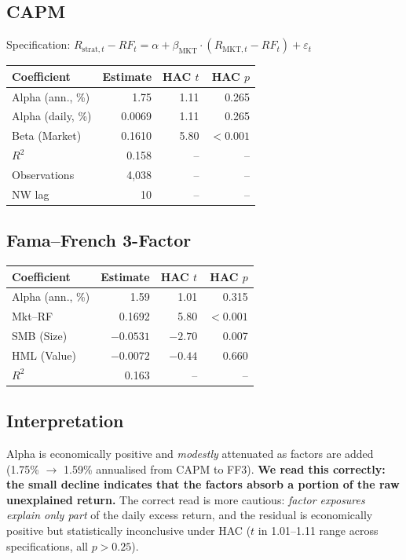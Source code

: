 \documentclass[11pt]{article}
\begin{document}
\subsection{CAPM}
Specification:
$R_{\mathrm{strat},t} - RF_t = \alpha + \beta_{\mathrm{MKT}}\cdot(R_{\mathrm{MKT},t} - RF_t) + \varepsilon_t$

\begin{center}
\small
\begin{tabular}{l r r r}
\toprule
\textbf{Coefficient} & \textbf{Estimate} & \textbf{HAC $t$} & \textbf{HAC $p$}\\
\midrule
Alpha (ann., \%)  & 1.75    & 1.11  & 0.265\\
Alpha (daily, \%) & 0.0069  & 1.11  & 0.265\\
Beta (Market)     & 0.1610  & 5.80  & $<0.001$\\
$R^2$             & 0.158   & --    & --\\
Observations      & 4{,}038 & --    & --\\
NW lag            & 10      & --    & --\\
\bottomrule
\end{tabular}
\end{center}

\subsection{Fama--French 3-Factor}
\begin{center}
\small
\begin{tabular}{l r r r}
\toprule
\textbf{Coefficient} & \textbf{Estimate} & \textbf{HAC $t$} & \textbf{HAC $p$}\\
\midrule
Alpha (ann., \%)  & 1.59    & 1.01   & 0.315\\
Mkt--RF           & 0.1692  & 5.80   & $<0.001$\\
SMB (Size)        & $-0.0531$ & $-2.70$ & 0.007\\
HML (Value)       & $-0.0072$ & $-0.44$ & 0.660\\
$R^2$             & 0.163   & --    & --\\
\bottomrule
\end{tabular}
\end{center}

\subsection{Interpretation}

Alpha is economically positive and \emph{modestly} attenuated as factors
are added (1.75\% $\to$ 1.59\% annualised from CAPM to FF3).
\textbf{We read this correctly: the small decline indicates that the
factors absorb a portion of the raw unexplained return.} The correct read is
more cautious: \emph{factor exposures explain only part} of the daily
excess return, and the residual is economically positive but statistically
inconclusive under HAC ($t$ in 1.01--1.11 range across specifications, all
$p > 0.25$).
\end{document}
